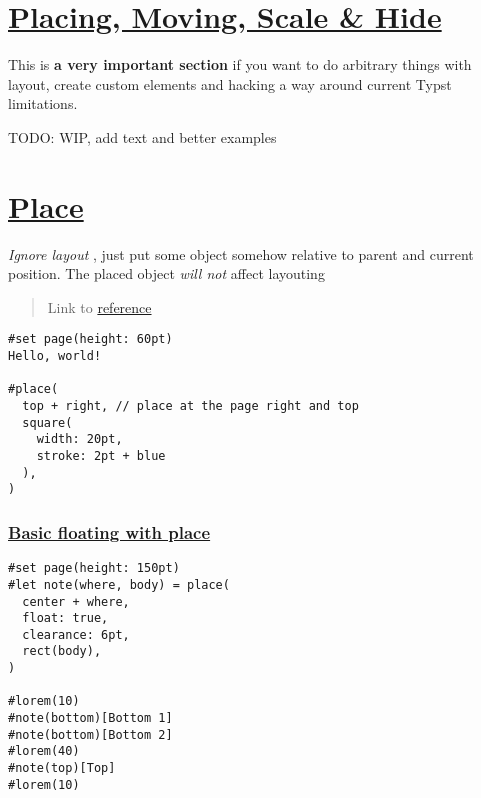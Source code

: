 \section{\texorpdfstring{\hyperref[placing-moving-scale--hide]{Placing,
Moving, Scale \&
Hide}}{Placing, Moving, Scale \& Hide}}\label{placing-moving-scale--hide}

This is \textbf{a very important section} if you want to do arbitrary
things with layout, create custom elements and hacking a way around
current Typst limitations.

TODO: WIP, add text and better examples

\section{\texorpdfstring{\hyperref[place]{Place}}{Place}}\label{place}

\emph{Ignore layout} , just put some object somehow relative to parent
and current position. The placed object \emph{will not} affect layouting

\begin{quote}
Link to \href{https://typst.app/docs/reference/layout/place/}{reference}
\end{quote}

\begin{verbatim}
#set page(height: 60pt)
Hello, world!

#place(
  top + right, // place at the page right and top
  square(
    width: 20pt,
    stroke: 2pt + blue
  ),
)
\end{verbatim}

\pandocbounded{}

\subsubsection{\texorpdfstring{\hyperref[basic-floating-with-place]{Basic
floating with
place}}{Basic floating with place}}\label{basic-floating-with-place}

\begin{verbatim}
#set page(height: 150pt)
#let note(where, body) = place(
  center + where,
  float: true,
  clearance: 6pt,
  rect(body),
)

#lorem(10)
#note(bottom)[Bottom 1]
#note(bottom)[Bottom 2]
#lorem(40)
#note(top)[Top]
#lorem(10)
\end{verbatim}

